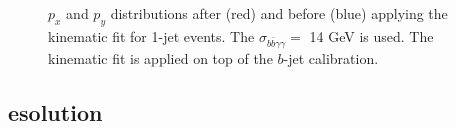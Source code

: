 \begin{figure}[htbp]
   \centering
   \begin{tcolorbox}[colback=black!5!white,colframe=white!75!black]
   \caption{$p_x$ and $p_y$ distributions after (red) and before (blue) applying the kinematic fit for 1-jet events. The $\sigma_{b\bar{b}\gamma\gamma} = $ 14 GeV is used. The kinematic fit is applied on top of the $b$-jet calibration.}
   \label{fig:Adx4:HH:1Jet}
   \end{tcolorbox}
   
\end{figure}

\subsection{\texorpdfstring{\mbb} resolution}

